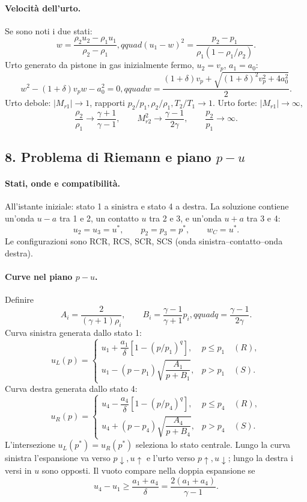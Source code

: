 \documentclass[11pt,a4paper]{article}
\begin{document}
\paragraph*{Velocità dell'urto.}
Se sono noti i due stati:
\[
w=\frac{\rho_2u_2-\rho_1u_1}{\rho_2-\rho_1},qquad
(u_1-w)^2=\frac{p_2-p_1}{\rho_1(1-\rho_1/\rho_2)}.
\]
Urto generato da pistone in gas inizialmente fermo, $u_2=v_p$, $a_1=a_0$:
\[
w^2-(1+\delta)v_pw-a_0^2=0,qquad
w=\frac{(1+\delta)v_p+\sqrt{(1+\delta)^2v_p^2+4a_0^2}}{2}.
\]
Urto debole: $|M_{r1}|\to1$, rapporti $p_2/p_1,\rho_2/\rho_1,T_2/T_1\to1$.
Urto forte: $|M_{r1}|\to\infty$,
\[
\frac{\rho_2}{\rho_1}\to\frac{\gamma+1}{\gamma-1},\qquad
M_{r2}^2\to\frac{\gamma-1}{2\gamma},\qquad \frac{p_2}{p_1}\to\infty.
\]

\subsection*{8. Problema di Riemann e piano $p-u$}

\paragraph*{Stati, onde e compatibilità.}
All'istante iniziale: stato 1 a sinistra e stato 4 a destra. La soluzione contiene
un'onda $u-a$ tra 1 e 2, un contatto $u$ tra 2 e 3, e un'onda $u+a$ tra 3 e 4:
\[
u_2=u_3=u^*,\qquad p_2=p_3=p^*,\qquad w_C=u^*.
\]
Le configurazioni sono RCR, RCS, SCR, SCS (onda sinistra--contatto--onda destra).

\paragraph*{Curve nel piano $p-u$.}
Definire
\[
A_i=\frac{2}{(\gamma+1)\rho_i},\qquad
B_i=\frac{\gamma-1}{\gamma+1}p_i,qquad q=\frac{\gamma-1}{2\gamma}.
\]
Curva sinistra generata dallo stato 1:
\[
u_L(p)=
\begin{cases}
u_1+\dfrac{a_1}{\delta}\left[1-(p/p_1)^q\right],&p\le p_1\quad(R),\\[4pt]
u_1-(p-p_1)\sqrt{\dfrac{A_1}{p+B_1}},&p>p_1\quad(S).
\end{cases}
\]
Curva destra generata dallo stato 4:
\[
u_R(p)=
\begin{cases}
u_4-\dfrac{a_4}{\delta}\left[1-(p/p_4)^q\right],&p\le p_4\quad(R),\\[4pt]
u_4+(p-p_4)\sqrt{\dfrac{A_4}{p+B_4}},&p>p_4\quad(S).
\end{cases}
\]
L'intersezione $u_L(p^*)=u_R(p^*)$ seleziona lo stato centrale. Lungo la curva
sinistra l'espansione va verso $p\downarrow,u\uparrow$ e l'urto verso
$p\uparrow,u\downarrow$; lungo la destra i versi in $u$ sono opposti.
Il vuoto compare nella doppia espansione se
\[
u_4-u_1\ge\frac{a_1+a_4}{\delta}=\frac{2(a_1+a_4)}{\gamma-1}.
\]
\end{document}
